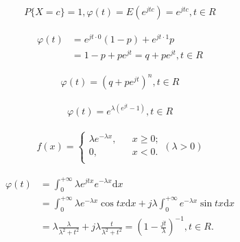 \begin{preview}
\setcounter{equation}{0}%
\begin{align}P\{X = c\} = 1, \varphi(t) = E(e^{jtc}) = e^{jtc}, t \in R\end{align}

\end{preview}

\begin{preview}
\setcounter{equation}{0}%
\begin{align}
\varphi(t) &= e^{jt \cdot 0} (1-p) + e^{jt \cdot 1} p\\
&= 1 - p + pe^{jt} = q + pe^{jt}, t\in R
\end{align}

\end{preview}

\begin{preview}
\setcounter{equation}{0}%
\begin{align}
  \varphi(t) = (q + pe^{jt})^n, t \in R
\end{align}

\end{preview}

\begin{preview}
\setcounter{equation}{0}%
\begin{align}
  \varphi(t) = e^{\lambda(e^{jt} - 1)}, t \in R
\end{align}

\end{preview}

\begin{preview}
\setcounter{equation}{0}%
\begin{align}
  f(x) =
\left\{
\begin{aligned}
\lambda e^{- \lambda x}, & &x \geq 0;\\
0, & &x<0.\\
\end{aligned}
\right.{(\lambda > 0)}
\end{align}

\end{preview}

\begin{preview}
\setcounter{equation}{0}%
\begin{align}
  \varphi(t) &= \int^{+\infty}_{0} \lambda e^{jtx} e^{-\lambda x} \mathrm{d}x\\
&=\int^{+\infty}_{0} \lambda e^{-\lambda x} \cos{tx} \mathrm{d}x + j \lambda \int^{+\infty}_{0} e^{-\lambda x} \sin{tx} \mathrm{d}x\\
&= \lambda \frac{\lambda}{\lambda^2 + t^2} + j \lambda \frac{t}{\lambda^2 + t^2} = \left(1- \frac{jt}{\lambda}\right)^{-1}, t \in R.
\end{align}

\end{preview}

